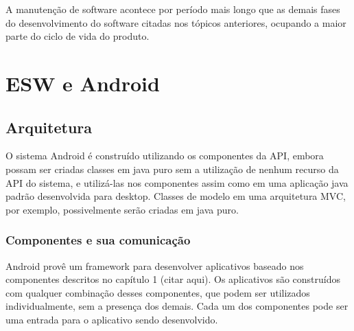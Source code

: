 A manutenção de software acontece por período mais longo que as demais fases do desenvolvimento do software citadas nos tópicos anteriores, ocupando a maior parte do ciclo de vida do produto.

\chapter{ESW e Android}
\label{cap:eswandroid}


\section{Arquitetura}

O sistema Android é construído utilizando os componentes da API, embora possam ser criadas classes em java puro sem a utilização de nenhum recurso da API do sistema, e utilizá-las nos componentes assim como em uma aplicação java padrão desenvolvida para desktop. Classes de modelo em uma arquitetura MVC, por exemplo, possivelmente serão criadas em java puro.

\subsection{Componentes e sua comunicação}

Android provê um framework para desenvolver aplicativos baseado nos componentes descritos no capítulo 1 (citar aqui). Os aplicativos são construídos com qualquer combinação desses componentes, que podem ser utilizados individualmente, sem a presença dos demais. Cada um dos componentes pode ser uma entrada para o aplicativo sendo desenvolvido.

